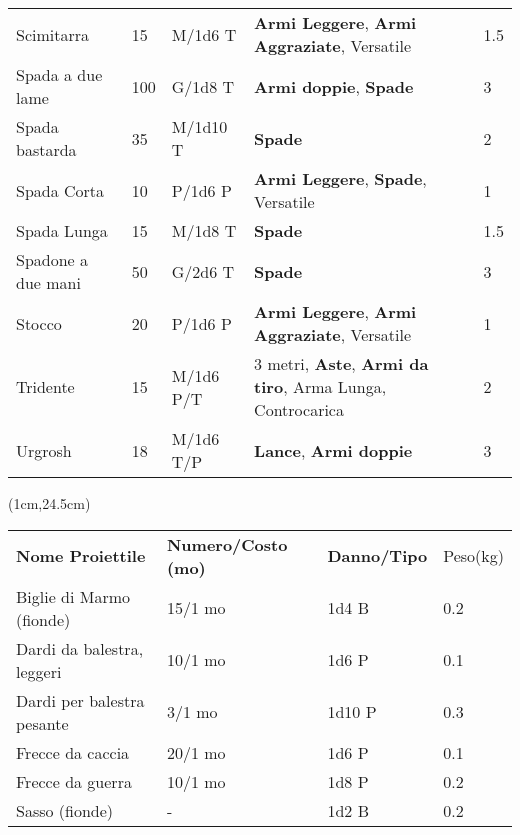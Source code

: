 \documentclass[a4paper,12 pt,openany]{book}
\begin{document}
\begin{textblock*}{19.5cm}
\begin{tabular}{lllll}
Scimitarra& 15 & M/1d6 T&\textbf{Armi Leggere}, \textbf{Armi Aggraziate}, Versatile& 1.5\\
Spada a due lame& 100& G/1d8 T& \textbf{Armi doppie}, \textbf{Spade}& 3\\
Spada bastarda& 35 & M/1d10 T&\textbf{Spade}& 2\\
Spada Corta& 10 & P/1d6 P&\textbf{Armi Leggere}, \textbf{Spade}, Versatile& 1\\
Spada Lunga& 15 & M/1d8 T&\textbf{Spade}& 1.5\\
Spadone a due mani& 50 & G/2d6 T&\textbf{Spade}& 3\\
Stocco& 20 & P/1d6 P& \textbf{Armi Leggere}, \textbf{Armi Aggraziate}, Versatile& 1\\
Tridente& 15 & M/1d6 P/T& 3 metri, \textbf{Aste}, \textbf{Armi da tiro}, Arma Lunga, Controcarica& 2\\
Urgrosh& 18 & M/1d6 T/P& \textbf{Lance}, \textbf{Armi doppie} & 3\\
\end{tabular}


	\end{textblock*}

	\begin{textblock*}{13cm}(1cm,24.5cm) %

		\footnotesize

\begin{tabular}{llll}
\textbf{Nome Proiettile}   & \textbf{Numero/Costo (mo)} & \textbf{Danno/Tipo} & Peso(kg) \\
Biglie di Marmo (fionde)   & 15/1 mo                    & 1d4 B               & 0.2      \\
Dardi da balestra, leggeri & 10/1 mo                    & 1d6 P               & 0.1      \\
Dardi per balestra pesante & 3/1 mo                     & 1d10 P              & 0.3      \\
Frecce da caccia           & 20/1 mo                    & 1d6 P               & 0.1      \\
Frecce da guerra           & 10/1 mo                    & 1d8 P               & 0.2      \\
Sasso (fionde)             & -                          & 1d2 B               & 0.2      \\
\end{tabular}

	\end{textblock*}

		~\newpage
\end{document}
